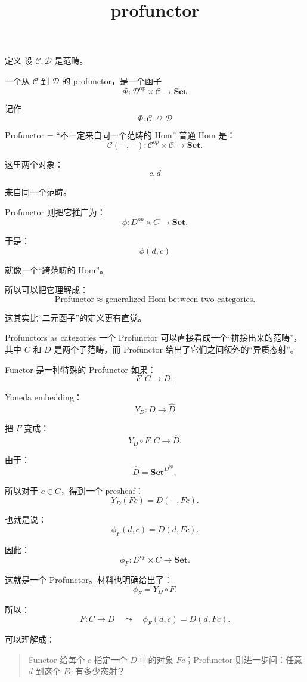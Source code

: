 \documentclass{beamer}
\title{profunctor}
\date{}
\begin{document}
\begin{frame}
    \titlepage
\end{frame}

\begin{frame}[fragile]{定义}
设 \(\mathcal C,\mathcal D\) 是范畴。

一个从 \(\mathcal C\) 到 \(\mathcal D\) 的 profunctor，是一个函子
\[
\boxed{
\Phi:\mathcal D^{\mathrm{op}}\times\mathcal C\to\mathbf{Set}
}
\]

记作
\[
\boxed{
\Phi:\mathcal C\nrightarrow\mathcal D
}
\]
\end{frame}

\begin{frame}{Profunctor = “不一定来自同一个范畴的 Hom”}
普通 Hom 是：
$$
\mathcal C(-,-):
\mathcal C^{op}\times\mathcal C\to\mathbf{Set}.
$$

这里两个对象：
$$
c,d
$$

来自同一个范畴。

Profunctor 则把它推广为：
$$
\phi:D^{op}\times C\to\mathbf{Set}.
$$

于是：
$$
\phi(d,c)
$$

就像一个“跨范畴的 Hom”。

所以可以把它理解成：
$$
\boxed{
\text{Profunctor}
\approx
\text{generalized Hom between two categories}.
}
$$

这其实比“二元函子”的定义更有直觉。
\end{frame}

\begin{frame}{Profunctors as categories}
一个 Profunctor 可以直接看成一个“拼接出来的范畴”，其中 \(C\) 和 \(D\) 是两个子范畴，而 Profunctor 给出了它们之间额外的“异质态射”。
\end{frame}

\begin{frame}[shrink]{Functor 是一种特殊的 Profunctor}
如果：
$$
F:C\to D,
$$

Yoneda embedding：
$$
Y_D:D\to\widehat D
$$

把 \(F\) 变成：
$$
Y_D\circ F:C\to\widehat D.
$$

由于：
$$
\widehat D=\mathbf{Set}^{D^{op}},
$$

所以对于 \(c\in C\)，得到一个 presheaf：
$$
Y_D(Fc)=D(-,Fc).
$$

也就是说：
$$
\boxed{
\phi_F(d,c)=D(d,Fc).
}
$$

因此：
$$
\phi_F:D^{op}\times C\to\mathbf{Set}.
$$

这就是一个 Profunctor。材料也明确给出了：
$$
\phi_F=Y_D\circ F.
$$

所以：
$$
\boxed{
F:C\to D
\quad\leadsto\quad
\phi_F(d,c)=D(d,Fc).
}
$$

可以理解成：

\begin{quote} Functor 给每个 \(c\) 指定一个 \(D\) 中的对象 \(Fc\)；Profunctor 则进一步问：任意 \(d\) 到这个 \(Fc\) 有多少态射？\end{quote}
\end{frame}
\end{document}
